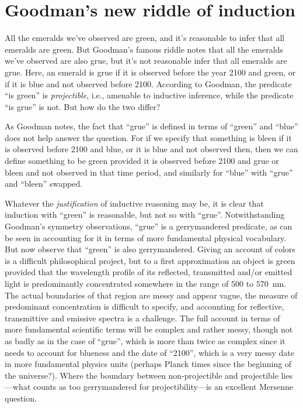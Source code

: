 \section{Goodman's new riddle of induction}
All the emeralds we've observed are green, and it's reasonable to infer that all emeralds are green.
But Goodman's famous riddle notes that all the emeralds we've observed are also grue, but it's not reasonable infer 
that all emeralds are grue. Here, an emerald is grue if it is observed before the year 2100 and green, or if it is 
blue and not observed before 2100. According to Goodman, the predicate ``is green'' is \textit{projectible}, i.e., amenable to 
inductive inference, while the predicate ``is grue'' is not. But how do the two differ?

As Goodman notes, the fact that ``grue'' is defined in terms of ``green'' and ``blue'' does not help answer the
question. For if we specify that something is bleen if it is observed before 2100 and blue, or it is blue and not observed
then, then we can define something to be green provided it is observed before 2100 and grue or bleen and not observed in that time period, and similarly for ``blue'' with ``grue'' and ``bleen'' swapped. 

Whatever the \textit{justification} of inductive reasoning may be, it is clear that induction with ``green'' is reasonable, but not so with
``grue''. Notwithstanding Goodman's symmetry observations, ``grue'' is a gerrymandered predicate, as can be seen in
accounting for it in terms of more fundamental physical vocabulary. But now observe that ``green'' is also gerrymandered. 
Giving an account of colors is a difficult philosophical project, but to a first approximation an object is green provided that the wavelength profile of its reflected, transmitted and/or emitted light is predominantly 
concentrated somewhere in the range of $500$ to $570$~nm. The actual boundaries of that region are messy and appear vague, the measure of
predominant concentration is difficult to specify, and accounting for reflective, transmittive and emissive spectra
is a challenge. The full account in terms of more fundamental scientific terms will be complex and rather messy, though 
not as badly as in the case of ``grue'', which is more than twice as complex since it needs to account for blueness
and the date of ``2100'', which is a very messy date in more fundamental physics units (perhaps 
Planck times since the beginning of the universe?). Where the boundary between non-projectible and projectible lies---what
counts as too gerrymandered for projectibility---is an excellent Mersenne question.

